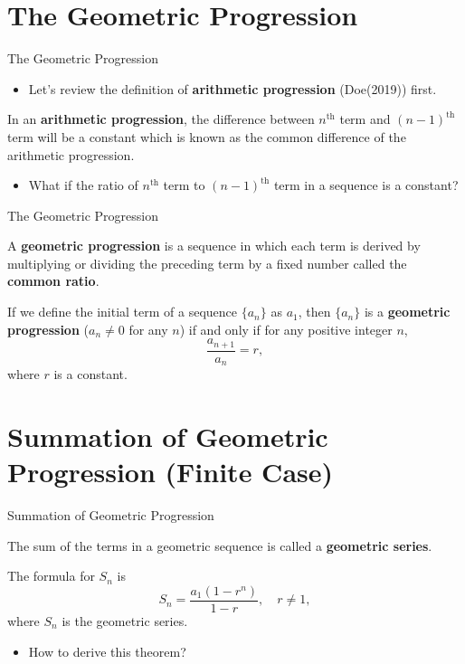 \section{The Geometric Progression}
\begin{frame}[<+->]{The Geometric Progression}
    \begin{itemize}
        \item Let's review the definition of \textbf{arithmetic progression} (Doe(2019)) first.
    \end{itemize}
    \begin{defn}
        In an \textbf{arithmetic progression}, the difference between $n^\text{th}$ term and $(n-1)^\text{th}$ term will be a constant which is known as the common difference of the arithmetic progression.
    \end{defn}
    \begin{itemize}
        \item What if the ratio of $n^\text{th}$ term to $(n-1)^\text{th}$ term in a sequence is a constant?
    \end{itemize}
\end{frame}

\begin{frame}[<+->]{The Geometric Progression}
    \begin{defn}
        A \textbf{geometric progression} is a sequence in which each term is derived by multiplying or dividing the preceding term by a fixed number called the \textbf{common ratio}.
    \end{defn}
    \begin{defn}
        If we define the initial term of a sequence $\{a_n\}$ as $a_1$, then $\{a_n\}$ is a \textbf{geometric progression} ($a_n\neq 0$ for any $n$) if and only if for any positive integer $n$,
        \[
            \frac{a_{n+1}}{a_n} = r,
        \]
        where $r$ is a constant.
    \end{defn}
\end{frame}



\section{Summation of Geometric Progression (Finite Case)}
\begin{frame}[<+->]{Summation of Geometric Progression}
    \begin{defn}
        The sum of the terms in a geometric sequence is called a \textbf{geometric series}.
    \end{defn}
    \begin{thm}
        The formula for $S_n$ is
        \[
            S_n = \frac{a_1(1-r^n)}{1-r},\quad r\neq 1,
        \]
        where $S_n$ is the geometric series.
    \end{thm}
    \begin{itemize}[<+->]
        \item How to derive this theorem?
    \end{itemize}
\end{frame}

